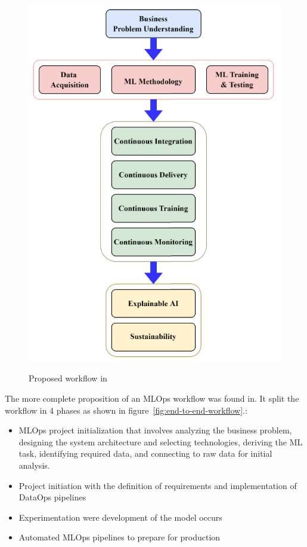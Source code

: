 \begin{figure}[!htbp]
    \caption{Proposed workflow in\cite{9792270}}
    \centering
    \includegraphics[scale=0.3]{images/taxo-workflow}
    \label{fig:taxo-workflow}
\end{figure}

The more complete proposition of an MLOps workflow was found in\cite{Kreuzberger2022MachineLO}.
It split the workflow in 4 phases as shown in figure~\ref{fig:end-to-end-workflow}.:

\begin{itemize}
    \item MLOps project initialization that involves analyzing the business problem, designing the system architecture and selecting technologies, deriving the ML task, identifying required data, and connecting to raw data for initial analysis.
    \item Project initiation with the definition of requirements and implementation of DataOps pipelines
    \item Experimentation were development of the model occurs
    \item Automated MLOps pipelines to prepare for production
\end{itemize}

